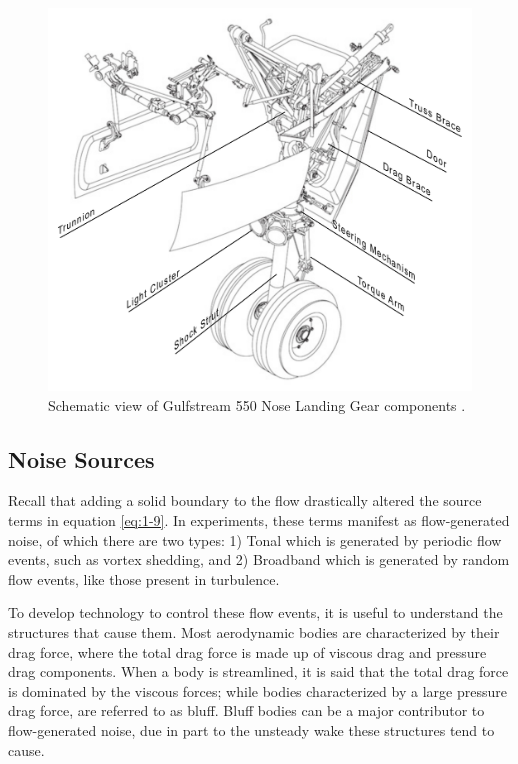 \begin{figure}
	\begin{center}
		\centerline{\includegraphics[scale=0.6]{figures/lg_schematic.pdf}}
		\caption{Schematic view of Gulfstream 550 Nose Landing Gear components \cite{g550uom}.}
		\label{fig:lg2}
	\end{center}
\end{figure}


\subsection{Noise Sources}
Recall that adding a solid boundary to the flow drastically altered the source terms in equation \ref{eq:1-9}. In experiments, these terms manifest as flow-generated noise, of which there are two types: 1) Tonal which is generated by periodic flow events, such as vortex shedding, and 2) Broadband which is generated by random flow events, like those present in turbulence. 

To develop technology to control these flow events, it is useful to understand the structures that cause them. Most aerodynamic bodies are characterized by their drag force, where the total drag force is made up of viscous drag and pressure drag components. When a body is streamlined, it is said that the total drag force is dominated by the viscous forces; while bodies characterized by a large pressure drag force, are referred to as bluff. Bluff bodies can be a major contributor to flow-generated noise, due in part to the unsteady wake these structures tend to cause. 

